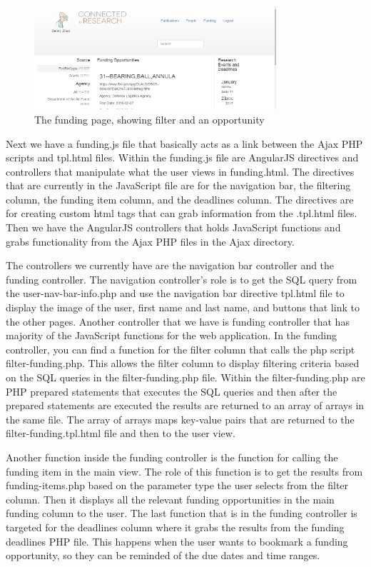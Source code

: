 \documentclass[onecolumn]{IEEEtran}
\begin{document}
\begin{figure}
    \centering
    \includegraphics[width=0.8\textwidth]{filter.png}
    \caption{The funding page, showing filter and an opportunity}
    \label{fig:filter}
\end{figure}

Next we have a funding.js file that basically acts as a link between the Ajax PHP scripts and tpl.html files. Within the funding.js file are AngularJS directives and controllers that manipulate what the user views in funding.html. The directives that are currently in the JavaScript file are for the navigation bar, the filtering column, the funding item column, and the deadlines column. The directives are for creating custom html tags that can grab information from the .tpl.html files. Then we have the AngularJS controllers that holds JavaScript functions and grabs functionality from the Ajax PHP files in the Ajax directory. 

The controllers we currently have are the navigation bar controller and the funding controller. The navigation controller's role is to get the SQL query from the user-nav-bar-info.php and use the navigation bar directive tpl.html file to display the image of the user, first name and last name, and buttons that link to the other pages. Another controller that we have is funding controller that has majority of the JavaScript functions for the web application. In the funding controller, you can find a function for the filter column that calls the php script filter-funding.php. This allows the filter column to display filtering criteria based on the SQL queries in the filter-funding.php file. Within the filter-funding.php are PHP prepared statements that executes the SQL queries and then after the prepared statements are executed the results are returned to an array of arrays in the same file. The array of arrays maps key-value pairs that are returned to the filter-funding.tpl.html file and then to the user view. 

Another function inside the funding controller is the function for calling the funding item in the main view. The role of this function is to get the results from funding-items.php based on the parameter type the user selects from the filter column. Then it displays all the relevant funding opportunities in the main funding column to the user. The last function that is in the funding controller is targeted for the deadlines column where it grabs the results from the funding deadlines PHP file. This happens when the user wants to bookmark a funding opportunity, so they can be reminded of the due dates and time ranges. 
\end{document}
